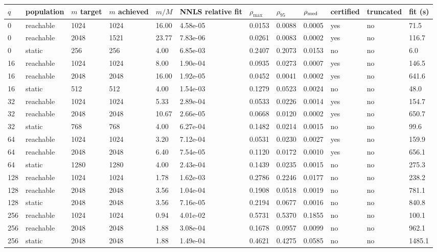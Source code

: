 \documentclass[11pt]{article}
\begin{document}
\begin{table}[htbp]\centering\small
\begin{tabular}{llllllllllll}\hline
$q$ & population & $m$ target & $m$ achieved & $m/M$ & NNLS relative fit & $\rho_{\max}$ & $\rho_{95}$ & $\rho_{\rm med}$ & certified & truncated & fit (s) \\ \hline
0 & reachable & 1024 & 1024 & 16.00 & 4.58e-05 & 0.0153 & 0.0088 & 0.0005 & yes & no & 71.5 \\
0 & reachable & 2048 & 1521 & 23.77 & 7.83e-06 & 0.0261 & 0.0083 & 0.0002 & yes & no & 116.7 \\
0 & static & 256 & 256 & 4.00 & 6.85e-03 & 0.2407 & 0.2073 & 0.0153 & no & no & 6.0 \\
16 & reachable & 1024 & 1024 & 8.00 & 1.90e-04 & 0.0935 & 0.0273 & 0.0007 & yes & no & 146.5 \\
16 & reachable & 2048 & 2048 & 16.00 & 1.92e-05 & 0.0452 & 0.0041 & 0.0002 & yes & no & 641.6 \\
16 & static & 512 & 512 & 4.00 & 1.54e-03 & 0.1279 & 0.0523 & 0.0024 & no & no & 48.0 \\
32 & reachable & 1024 & 1024 & 5.33 & 2.89e-04 & 0.0533 & 0.0226 & 0.0014 & yes & no & 154.7 \\
32 & reachable & 2048 & 2048 & 10.67 & 2.66e-05 & 0.0668 & 0.0120 & 0.0002 & yes & no & 650.7 \\
32 & static & 768 & 768 & 4.00 & 6.27e-04 & 0.1482 & 0.0214 & 0.0015 & no & no & 99.6 \\
64 & reachable & 1024 & 1024 & 3.20 & 7.12e-04 & 0.0531 & 0.0230 & 0.0027 & yes & no & 159.9 \\
64 & reachable & 2048 & 2048 & 6.40 & 7.54e-05 & 0.1120 & 0.0172 & 0.0010 & yes & no & 656.1 \\
64 & static & 1280 & 1280 & 4.00 & 2.43e-04 & 0.1439 & 0.0235 & 0.0015 & no & no & 275.3 \\
128 & reachable & 1024 & 1024 & 1.78 & 1.62e-03 & 0.2786 & 0.2246 & 0.0177 & no & no & 238.2 \\
128 & reachable & 2048 & 2048 & 3.56 & 1.04e-04 & 0.1908 & 0.0518 & 0.0019 & no & no & 781.1 \\
128 & static & 2048 & 2048 & 3.56 & 7.16e-05 & 0.2194 & 0.0677 & 0.0016 & no & no & 840.8 \\
256 & reachable & 1024 & 1024 & 0.94 & 4.01e-02 & 0.5731 & 0.5370 & 0.1855 & no & no & 100.1 \\
256 & reachable & 2048 & 2048 & 1.88 & 3.08e-04 & 0.1678 & 0.0957 & 0.0099 & no & no & 962.1 \\
256 & static & 2048 & 2048 & 1.88 & 1.49e-04 & 0.4621 & 0.4275 & 0.0585 & no & no & 1485.1 \\
\hline\end{tabular}
\end{table}
\end{document}
